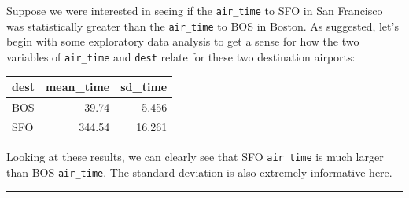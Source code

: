 \documentclass[]{tufte-book}
\newenvironment{Shaded}{\begin{snugshade}}{\end{snugshade}}
\newcommand{\KeywordTok}[1]{\textcolor[rgb]{0.13,0.29,0.53}{\textbf{{#1}}}}
\newcommand{\DataTypeTok}[1]{\textcolor[rgb]{0.13,0.29,0.53}{{#1}}}
\newcommand{\DecValTok}[1]{\textcolor[rgb]{0.00,0.00,0.81}{{#1}}}
\newcommand{\StringTok}[1]{\textcolor[rgb]{0.31,0.60,0.02}{{#1}}}
\newcommand{\NormalTok}[1]{{#1}}
\let\oldrule=\rule
\renewcommand{\rule}[1]{\oldrule{\linewidth}}
\theoremstyle{definition}
\theoremstyle{definition}
\theoremstyle{remark}
\begin{document}
\begin{Shaded}
\end{Shaded}

Suppose we were interested in seeing if the \texttt{air\_time} to SFO in
San Francisco was statistically greater than the \texttt{air\_time} to
BOS in Boston. As suggested, let's begin with some exploratory data
analysis to get a sense for how the two variables of \texttt{air\_time}
and \texttt{dest} relate for these two destination airports:

\begin{Shaded}
\end{Shaded}

\begin{tabular}{l|r|r}
\hline
dest & mean\_time & sd\_time\\
\hline
BOS & 39.74 & 5.456\\
\hline
SFO & 344.54 & 16.261\\
\hline
\end{tabular}

Looking at these results, we can clearly see that SFO \texttt{air\_time}
is much larger than BOS \texttt{air\_time}. The standard deviation is
also extremely informative here.

\begin{center}\rule{0.5\linewidth}{\linethickness}\end{center}
\end{document}
